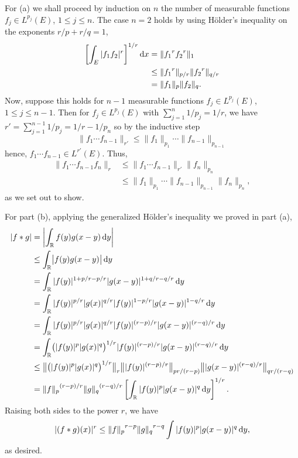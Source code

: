 \begin{solution}
  For (a) we shall proceed by induction on \(n\) the number of measurable
  functions \(f_j\in L^{p_j}(E)\), \(1\leq j\leq n\). The case \(n=2\)
  holds by using Hölder's inequality on the exponents \(r/p+r/q=1\),
  \begin{align*}
    \left[\int_E|f_1f_2|^r\right]^{1/r}\rmd x
    &=\|{f_1}^{\cramped{r}}{f_2}^{\cramped{r}}\|_1\\
    &\leq\|{f_1}^{\cramped r}\|_{p/r}\|{f_2}^{\cramped r}\|_{q/r}\\
    &=\|f_1\|_p\|f_2\|_q.
  \end{align*}
  Now, suppose this holds for \(n-1\) measurable functions
  \(f_j\in L^{p_j}(E)\), \(1\leq j\leq n-1\). Then for
  \(f_j\in L^{p_j}(E)\) with \(\sum_{j=1}^n 1/p_j=1/r\), we have
  \(r'=\sum_{j=1}^{n-1}1/p_j=1/r-1/p_n\) so by the inductive step
  \[
    \|f_1\dotsm f_{n-1}\|_{r'}\leq%
    \|f_1\|_{p_1}\dotsm\|f_{n-1}\|_{p_{n-1}}
  \]
  hence, \(f_1\dotsm f_{n-1}\in L^{r'}(E)\). Thus,
  \begin{align*}
    \|f_1\dotsm f_{n-1}f_n\|_r
    &\leq \|f_1\dotsm f_{n-1}\|_{r'}\|f_n\|_{p_n}\\
    &\leq\|f_1\|_{p_1}\dotsm\|f_{n-1}\|_{p_{n-1}}\|f_n\|_{p_n},
  \end{align*}
  as we set out to show.

  For part (b), applying the generalized Hölder's inequality we proved in
  part (a),
  \begin{align*}
    |f*g|
    &=\left|\int_\bbR f(y)g(x-y)\diff y\right|\\
    &\leq\int_\bbR\bigl|f(y)g(x-y)\bigr|\diff y\\
    &=\int_\bbR|f(y)|^{1+p/r-p/r}|g(x-y)|^{1+q/r-q/r}\diff y\\
    &=\int_\bbR|f(y)|^{p/r}|g(x)|^{q/r}|f(y)|^{1-p/r}|g(x-y)|^{1-q/r}\diff
      y\\
    &=\int_\bbR|f(y)|^{p/r}|g(x)|^{q/r}|f(y)|^{(r-p)/r}|g(x-y)|^{(r-q)/r}\diff
      y\\
    &=\int_\bbR\bigl(|f(y)|^p|g(x)|^q\bigr)^{1/r}|f(y)|^{(r-p)/r}
      |g(x-y)|^{(r-q)/r}\diff y\\
    &\leq
      \bigl\|\bigl(|f(y)|^p|g(x)|^q\bigr)^{1/r}\bigr\|_r
      \bigl\||f(y)|^{(r-p)/r}\bigr\|_{pr/(r-p)}
      \bigl\||g(x-y)|^{(r-q)/r}\bigr\|_{qr/(r-q)}\\
    &={\|f\|_p}^{\cramped{(r-p)/r}}{\|g\|_q}^{\cramped{(r-q)/r}}
      \left[\int_\bbR|f(y)|^p|g(x-y)|^q\diff y\right]^{1/r}.
  \end{align*}
  Raising both sides to the power \(r\), we have
  \[
    |(f*g)(x)|^r\leq{\|f\|_p}^{\cramped{r-p}}{\|g\|_q}^{\cramped{r-q}}\int|f(y)|^p|g(x-y)|^q\diff
    y,
  \]
  as desired.


\end{solution}
